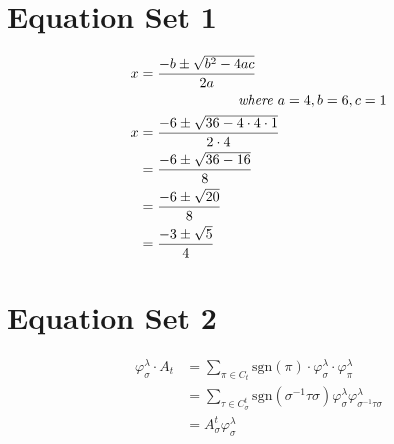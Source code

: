 \documentclass[a4paper]{article}
\begin{document}
    \section*{Equation Set 1}
    \begin{align*}
        x &= \frac{-b \pm \sqrt{b^2 - 4ac}}{2a} \\
        &\hspace{25mm} \textit{where } a = 4, b = 6, c = 1 \\
        x &= \frac{-6 \pm \sqrt{36 - 4 \cdot 4 \cdot 1}}{2 \cdot 4} \\
        &= \frac{-6 \pm \sqrt{36 - 16}}{8} \\
        &= \frac{-6 \pm \sqrt{20}}{8} \\
        &= \frac{-3 \pm \sqrt{5}}{4}
    \end{align*}

    \section*{Equation Set 2}
    \begin{align*}
        \varphi_{\sigma}^{\lambda} \cdot A_{t} &= \sum_{\pi \in C_{t}} \text{sgn}(\pi) \cdot \varphi_{\sigma}^{\lambda} \cdot \varphi_{\pi}^{\lambda} \\
        &= \sum_{\tau \in C_{\sigma}^{t}} \text{sgn}(\sigma^{-1} \tau \sigma) \varphi_{\sigma}^{\lambda} \varphi_{\sigma^{-1} \tau \sigma}^{\lambda} \\
        &= A_{\sigma}^{t} \varphi_{\sigma}^{\lambda}
    \end{align*}
\end{document}
